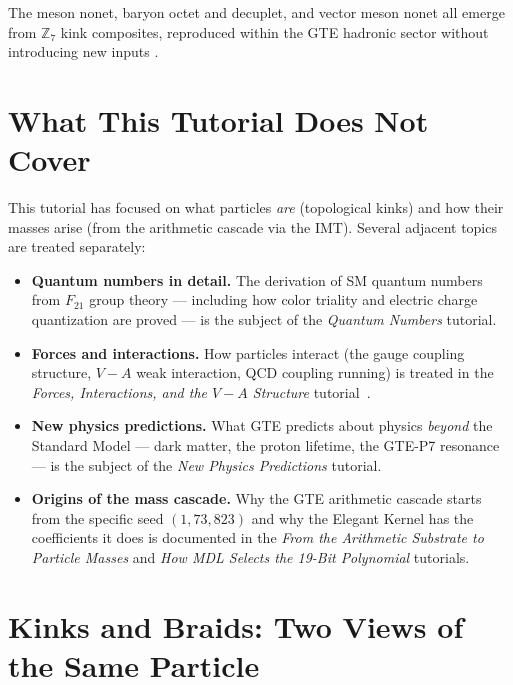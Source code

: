 \documentclass[11pt,a4paper]{article}
\begin{document}
The meson nonet, baryon octet and decuplet, and vector meson nonet all emerge
from $\mathbb{Z}_7$ kink composites, reproduced within the GTE hadronic sector
without introducing new inputs \cite{SpivackGTECompleteFramework}.

\section{What This Tutorial Does Not Cover}
\label{sec:scope}

This tutorial has focused on what particles \emph{are} (topological kinks) and
how their masses arise (from the arithmetic cascade via the IMT).  Several
adjacent topics are treated separately:

\begin{itemize}[itemsep=4pt]
  \item \textbf{Quantum numbers in detail.} The derivation of SM quantum numbers
    from $F_{21}$ group theory — including how color triality and electric charge
    quantization are proved — is the subject of the \emph{Quantum Numbers}
    tutorial.

  \item \textbf{Forces and interactions.} How particles interact (the gauge
    coupling structure, $V{-}A$ weak interaction, QCD coupling running) is
    treated in the \emph{Forces, Interactions, and the $V-A$ Structure} tutorial~\cite{SpivackTutorialForces}.

  \item \textbf{New physics predictions.} What GTE predicts about physics
    \emph{beyond} the Standard Model — dark matter, the proton lifetime, the
    GTE-P7 resonance — is the subject of the \emph{New Physics Predictions}
    tutorial.

  \item \textbf{Origins of the mass cascade.} Why the GTE arithmetic cascade
    starts from the specific seed $(1, 73, 823)$ and why the Elegant Kernel has
    the coefficients it does is documented in the \emph{From the Arithmetic
    Substrate to Particle Masses} and \emph{How MDL Selects the 19-Bit
    Polynomial} tutorials.
\end{itemize}

\section{Kinks and Braids: Two Views of the Same Particle}
\label{sec:kink_braid}
\end{document}

